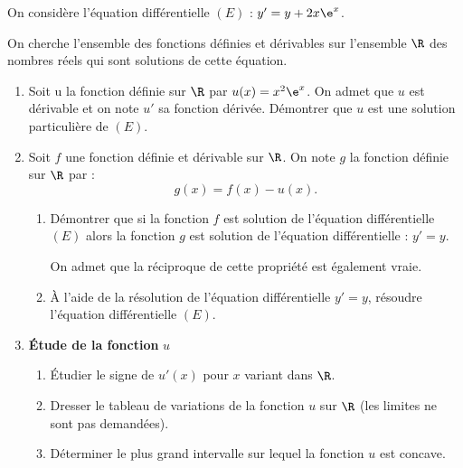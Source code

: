 On considère l'équation différentielle $(E)$ : $y' = y + 2x\e^{x}$.

\smallskip

On cherche l'ensemble des fonctions définies et dérivables sur l'ensemble $\R$ des nombres réels qui sont solutions de cette équation.

\begin{enumerate}
	\item Soit u la fonction définie sur $\R$ par $u(x) = x^2\e^x$. On admet que $u$ est dérivable et on note $u'$ sa fonction dérivée. Démontrer que $u$ est une solution particulière de $(E)$.
	\item Soit $f$ une fonction définie et dérivable sur $\R$. On note $g$ la fonction définie sur $\R$ par : \[ g(x)=f(x)-u(x). \]
	\begin{enumerate}
		\item Démontrer que si la fonction $f$ est solution de l'équation différentielle $(E)$ alors la fonction $g$ est solution de l'équation différentielle : $y' = y$.
		
		On admet que la réciproque de cette propriété est également vraie.
		\item À l'aide de la résolution de l'équation différentielle $y' = y$, résoudre l'équation différentielle $(E)$.
	\end{enumerate}
	\item \textbf{Étude de la fonction} \boldmath$u$\unboldmath
	\begin{enumerate}
		\item Étudier le signe de $u'(x)$ pour $x$ variant dans $\R$.
		\item Dresser le tableau de variations de la fonction $u$ sur $\R$ (les limites ne sont pas demandées).
		\item Déterminer le plus grand intervalle sur lequel la fonction $u$ est concave.
	\end{enumerate}
\end{enumerate}